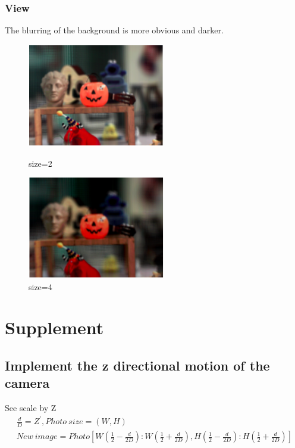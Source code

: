 \documentclass[letterpaper,12pt]{article}
\begin{document}
\subsubsection{View}
The blurring of the background is more obvious and darker.
	\begin{figure}[htbp]
	\centering
	\begin{minipage}[t]{0.48\textwidth}
		\centering
		\includegraphics[width=6cm]{Image/size2.png}
		\caption{size=2}
	\end{minipage}
	\begin{minipage}[t]{0.48\textwidth}
		\centering
		\includegraphics[width=6cm]{Image/size4.png}
		\caption{size=4}
	\end{minipage}
\end{figure}

\section{Supplement}
\subsection{Implement the z directional motion of the camera}
See scale by Z
\begin{equation*}
\begin{aligned}
\frac{d}{D} = Z^{'},Photo\ size = (W,H)\\
New\ image = Photo[W(\frac{1}{2}-\frac{d}{2D}):W(\frac{1}{2}+\frac{d}{2D}),H(\frac{1}{2}-\frac{d}{2D}):H(\frac{1}{2}+\frac{d}{2D})]
\end{aligned}
\end{equation*}
\end{document}
